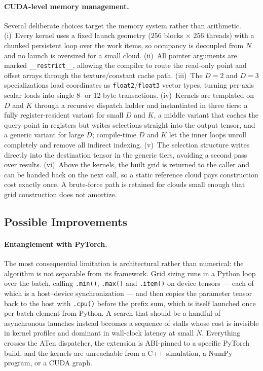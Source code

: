 \documentclass[11pt]{article}
\begin{document}
\paragraph{CUDA-level memory management.}
Several deliberate choices target the memory system rather than arithmetic.
(i)~Every kernel uses a fixed launch geometry ($256$ blocks $\times$ $256$
threads) with a chunked persistent loop over the work items, so occupancy is
decoupled from $N$ and no launch is oversized for a small cloud. (ii)~All
pointer arguments are marked \texttt{\_\_restrict\_\_}, allowing the compiler to
route the read-only point and offset arrays through the texture/constant cache
path. (iii)~The $D=2$ and $D=3$ specializations load coordinates as
\texttt{float2}/\texttt{float3} vector types, turning per-axis scalar loads into
single 8- or 12-byte transactions. (iv)~Kernels are templated on $D$ and $K$
through a recursive dispatch ladder and instantiated in three tiers: a fully
register-resident variant for small $D$ and $K$, a middle variant that caches
the query point in registers but writes selections straight into the output
tensor, and a generic variant for large $D$; compile-time $D$ and $K$ let the
inner loops unroll completely and remove all indirect indexing. (v)~The
selection structure writes directly into the destination tensor in the generic
tiers, avoiding a second pass over results. (vi)~Above the kernels, the built
grid is returned to the caller and can be handed back on the next call, so a
static reference cloud pays construction cost exactly once. A brute-force path
is retained for clouds small enough that grid construction does not amortize.

\subsection{Possible Improvements}
\label{sec:original-improvements}

\paragraph{Entanglement with PyTorch.}
The most consequential limitation is architectural rather than numerical: the
algorithm is not separable from its framework. Grid sizing runs in a Python loop
over the batch, calling \texttt{.min()}, \texttt{.max()} and \texttt{.item()} on
device tensors --- each of which is a host--device synchronization --- and then
copies the parameter tensor back to the host with \texttt{.cpu()} before the
prefix sum, which is itself launched once per batch element from Python. A
search that should be a handful of asynchronous launches instead becomes a
sequence of stalls whose cost is invisible in kernel profiles and dominant in
wall-clock latency at small $N$. Everything crosses the ATen dispatcher, the
extension is ABI-pinned to a specific PyTorch build, and the kernels are
unreachable from a C++ simulation, a NumPy program, or a CUDA graph.
\end{document}
